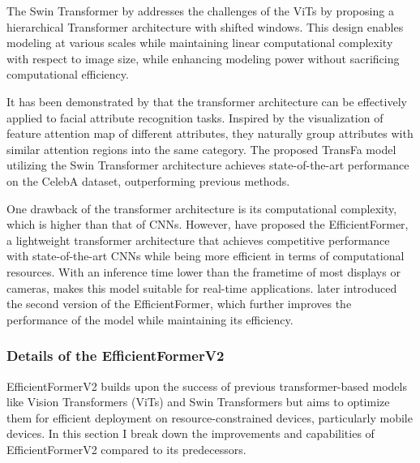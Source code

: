 \documentclass[a4paper,oneside]{article}
\begin{document}
The Swin Transformer by \citet{DBLP:journals/corr/abs-2103-14030} addresses the challenges of the ViTs by proposing a hierarchical Transformer architecture with shifted windows.
This design enables modeling at various scales while maintaining linear computational complexity with respect to image size, while enhancing modeling power without sacrificing computational efficiency.

It has been demonstrated by \citet{liu2022transfa} that the transformer architecture can be effectively applied to facial attribute recognition tasks.
Inspired by the visualization of feature attention map of different attributes, they naturally group attributes with similar attention regions into the same category.
The proposed TransFa model utilizing the Swin Transformer architecture achieves state-of-the-art performance on the CelebA dataset, outperforming previous methods.

One drawback of the transformer architecture is its computational complexity, which is higher than that of CNNs.
However, \citet{li2022efficientformer} have proposed the EfficientFormer, a lightweight transformer architecture that achieves competitive performance with state-of-the-art CNNs while being more efficient in terms of computational resources.
With an inference time lower than the frametime of most displays or cameras, makes this model suitable for real-time applications.
\citet{li2022rethinking} later introduced the second version of the EfficientFormer, which further improves the performance of the model while maintaining its efficiency.

\subsubsection{Details of the EfficientFormerV2}
EfficientFormerV2 builds upon the success of previous transformer-based models like Vision Transformers (ViTs) and Swin Transformers but aims to optimize them for efficient deployment on resource-constrained devices, particularly mobile devices.
In this section I break down the improvements and capabilities of EfficientFormerV2 compared to its predecessors.
\end{document}
